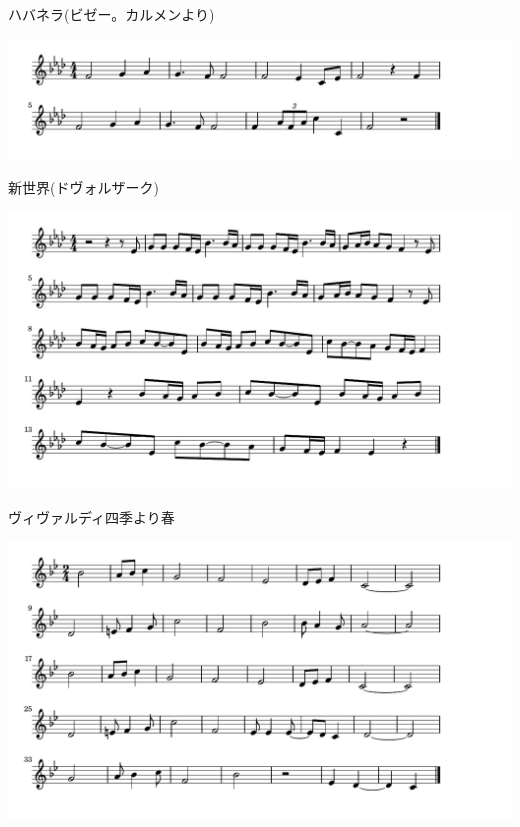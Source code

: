 \documentclass[a4paper]{ltjsarticle}
\begin{document}
\vspace{-10mm} \hspace{10mm}
ハバネラ(ビゼー。カルメンより)

\includegraphics[clip]{shinsekai_crop.pdf}

\vspace{-10mm} \hspace{10mm}
新世界(ドヴォルザーク)

\includegraphics[clip]{vivaldishiki_crop.pdf}

\vspace{-10mm} \hspace{10mm}
ヴィヴァルディ四季より春

\includegraphics[clip]{ifudodo_crop.pdf}
\end{document}
